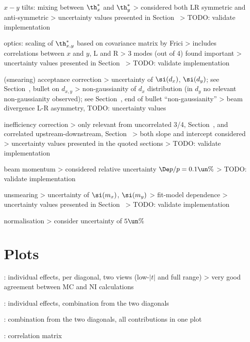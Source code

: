 \> $x-y$ tilts: mixing between $\th^*_{x}$ and $\th^*_{y}$
\>> considered both LR symmetric and anti-symmetric
\>> uncertainty values presented in Section~
\>> TODO: validate implementation

\> optics: scaling of $\th^*_{x,y}$ based on covariance matrix by Frici
\>> includes correlations between $x$ and $y$, L and R
\>> 3 modes (out of 4) found important
\>> uncertainty values presented in Section~
\>> TODO: validate implementation

\> (smearing) acceptance correction
\>> uncertainty of $\si(d_x)$, $\si(d_y)$; see Section~, bullet on $d_{x,y}$
\>> non-gaussianity of $d_x$ distribution (in $d_y$ no relevant non-gaussianity observed); see Section~, end of bullet ``non-gaussianity''
\>> beam divergence L-R asymmetry, TODO: uncertainty values

\> inefficiency correction
\>> only relevant from uncorrelated 3/4, Section~, and correlated upstream-downstream, Section~
\>> both slope and intercept considered
\>> uncertainty values presented in the quoted sections
\>> TODO: validate implementation

\> beam momentum
\>> considered relative uncertainty $\De p/p = 0.1\un{\%}$
\>> TODO: validate implementation

\> unsmearing
\>> uncertainty of $\si(m_x)$, $\si(m_y)$
\>> fit-model dependence
\>> uncertainty values presented in Section~
\>> TODO: validate implementation

\> normalisation
\>> consider uncertainty of $5\un{\%}$


\section[systematics-plots]{Plots}

\>  : individual effects, per diagonal, two views (low-$|t|$ and full range)
\>> very good agreement between MC and NI calculations

\>  : individual effects, combination from the two diagonals

\>  : combination from the two diagonals, all contributions in one plot

\>  : correlation matrix


\EndText
\bye
